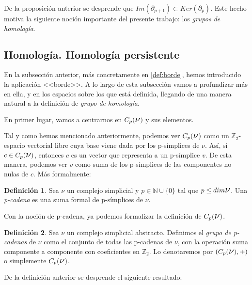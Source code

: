 \documentclass[12pt, a4paper]{article}
\numberwithin{equation}{section}
\theoremstyle{definition}
\newtheorem{defi}{Definición}
\theoremstyle{remark}
\theoremstyle{plain}
\begin{document}
	De la proposición anterior se desprende que $Im(\partial_{p+1}) 
	\subset Ker(\partial_{p})$. Este hecho motiva la siguiente noción 
	importante del presente trabajo: los \emph{grupos de homología}.
 
	\newpage

	\subsection{Homología. Homología persistente}
	
	En la subsección anterior, más concretamente en \ref{def:borde}, hemos 
	introducido la aplicación <<borde>>. A lo largo de esta subsección 
	vamos a profundizar más en ella, y en los espacios sobre los que está
	definida, llegando de una manera natural a la definición de 
	\emph{grupo de homología}.

	En primer lugar, vamos a centrarnos en 
	$C_{p}(\text{{\Large $\nu$}})$ y sus elementos.

	Tal y como hemos mencionado anteriormente, podemos ver 
	$C_{p}(\text{{\Large $\nu$}})$ como un $\mathbb{Z}_{2}$-espacio 
	vectorial libre cuya base viene dada por los p-símplices de 
	{\Large $\nu$}. Así, si $c \in C_{p}(\text{{\Large $\nu$}})$, entonces
	$c$ es un vector que representa a un p-símplice $v$. De esta manera,
	podemos ver $v$ como suma de los p-símplices de las componentes no 
	nulas de $c$. Más formalmente:

	\begin{defi}
		Sea {\Large $\nu$} un complejo simplicial y $p \in \mathbb{N}
		\cup\{0\}$ 
		tal que $p\leq dim \text{{\Large $\nu$}}$. Una 
		\textit{p-cadena} es una suma formal de p-símplices de 
		{\Large $\nu$}.
	\end{defi}
	
	Con la noción de p-cadena, ya podemos formalizar la definición de 
	$C_{p}(\text{{\Large $\nu$}})$. 

	\begin{defi}
		Sea {\Large $\nu$} un complejo simplicial abstracto. Definimos
		el \textit{grupo de p-cadenas} de {\Large $\nu$} como el 
		conjunto de todas las p-cadenas de 
		{\Large $\nu$}, con la operación suma componente a componente 
		con coeficientes en $\mathbb{Z}_{2}$. Lo denotaremos por 
		$(C_{p}(\text{{\Large $\nu$}}), +)$ o simplemente 
		$C_{p}(\text{{\Large $\nu$}})$.
	\end{defi}

	De la definición anterior se desprende el siguiente resultado:
\end{document}

